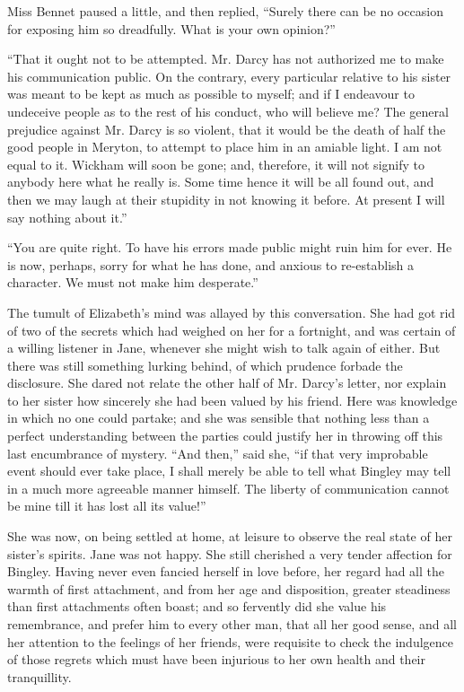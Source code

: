 Miss Bennet paused a little, and then replied, ``Surely there can be no occasion for exposing him so dreadfully. What is your own opinion?''

``That it ought not to be attempted. Mr. Darcy has not authorized me to make his communication public. On the contrary, every particular relative to his sister was meant to be kept as much as possible to myself; and if I endeavour to undeceive people as to the rest of his conduct, who will believe me? The general prejudice against Mr. Darcy is so violent, that it would be the death of half the good people in Meryton, to attempt to place him in an amiable light. I am not equal to it. Wickham will soon be gone; and, therefore, it will not signify to anybody here what he really is. Some time hence it will be all found out, and then we may laugh at their stupidity in not knowing it before. At present I will say nothing about it.''

``You are quite right. To have his errors made public might ruin him for ever. He is now, perhaps, sorry for what he has done, and anxious to re-establish a character. We must not make him desperate.''

The tumult of Elizabeth's mind was allayed by this conversation. She had got rid of two of the secrets which had weighed on her for a fortnight, and was certain of a willing listener in Jane, whenever she might wish to talk again of either. But there was still something lurking behind, of which prudence forbade the disclosure. She dared not relate the other half of Mr. Darcy's letter, nor explain to her sister how sincerely she had been valued by his friend. Here was knowledge in which no one could partake; and she was sensible that nothing less than a perfect understanding between the parties could justify her in throwing off this last encumbrance of mystery. ``And then,'' said she, ``if that very improbable event should ever take place, I shall merely be able to tell what Bingley may tell in a much more agreeable manner himself. The liberty of communication cannot be mine till it has lost all its value!''

She was now, on being settled at home, at leisure to observe the real state of her sister's spirits. Jane was not happy. She still cherished a very tender affection for Bingley. Having never even fancied herself in love before, her regard had all the warmth of first attachment, and from her age and disposition, greater steadiness than first attachments often boast; and so fervently did she value his remembrance, and prefer him to every other man, that all her good sense, and all her attention to the feelings of her friends, were requisite to check the indulgence of those regrets which must have been injurious to her own health and their tranquillity.

